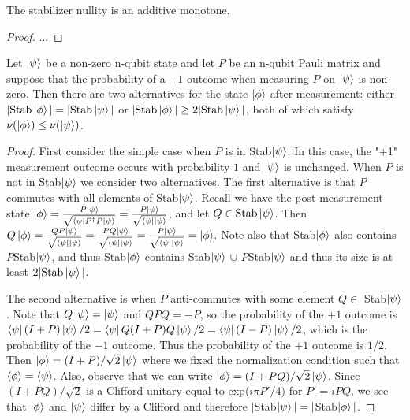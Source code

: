 \documentclass[12pt]{dalthesis}
\begin{document}
\begin{proposition}
The stabilizer nullity is an additive monotone.
\end{proposition}
\begin{proof}
...
\end{proof}

\begin{proposition}
Let $\ket{\psi}$ be a non-zero n-qubit state and let $P$ be an n-qubit Pauli matrix and suppose that the probability of a $+1$ outcome when measuring $P$ on $\ket{\psi}$ is non-zero. Then there are two alternatives for the state $\ket{\phi}$ after measurement: either $|\text{Stab}\ket{\phi}| = |\text{Stab}\ket{\psi}|$ or $|\text{Stab}\ket{\phi}| \geq 2|\text{Stab}\ket{\psi}|$, both of which satisfy $\nu(\ket{\phi}) \leq \nu(\ket{\psi})$.
\end{proposition}

\begin{proof}
First consider the simple case when $P$ is in Stab$\ket{\psi}$. In this case, the "+1" measurement outcome occurs with probability $1$ and $\ket{\psi}$ is unchanged. When $P$ is not in Stab$\ket{\psi}$ we consider two alternatives. The first alternative is that $P$ commutes with all elements of Stab$\ket{\psi}$. Recall we have the post-measurement state $\ket{\phi} = \frac{P\ket{\psi}}{\sqrt{\bra{\psi}P^{\dag}P\ket{\psi}}} = \frac{P\ket{\psi}}{\sqrt{\bra{\psi}\ket{\psi}}}$, and let $Q \in \text{Stab}\ket{\psi}$. Then $Q\ket{\phi} = \frac{QP\ket{\psi}}{\sqrt{\bra{\psi}\ket{\psi}}} = \frac{PQ\ket{\psi}}{\sqrt{\bra{\psi}\ket{\psi}}} = \frac{P\ket{\psi}}{\sqrt{\bra{\psi}\ket{\psi}}} = \ket{\phi}$. Note also that Stab$\ket{\phi}$ also contains $P$Stab$\ket{\psi}$, and thus Stab$\ket{\phi}$ contains Stab$\ket{\psi}$ $\cup$ $P$Stab$\ket{\psi}$ and thus its size is at least $2| \text{Stab}\ket{\psi}|$.

The second alternative is when $P$ anti-commutes with some element $Q \in$ Stab$\ket{\psi}$. Note that $Q\ket{\psi} = \ket{\psi}$ and $QPQ = -P$, so the probability of the $+1$ outcome is $\bra{\psi}(I+P)\ket{\psi}/2 = \bra{\psi}Q(I+P)Q\ket{\psi}/2 = \bra{\psi}(I-P)\ket{\psi}/2$, which is the probability of the $-1$ outcome. Thus the probability of the $+1$ outcome is $1/2$. Then $\ket{\phi} = (I+P)/\sqrt{2}\ket{\psi}$ where we fixed the normalization condition such that $\braket{\phi} = \braket{\psi}$. Also, observe that we can write $\ket{\phi} = (I+PQ)/\sqrt{2}\ket{\psi}$. Since $(I+PQ)/\sqrt{2}$ is a Clifford unitary equal to exp($i\pi P'/4)$ for $P' = iPQ$, we see that $\ket{\phi}$ and $\ket{\psi}$ differ by a Clifford and therefore $|$Stab$\ket{\psi}| = |$Stab$\ket{\phi}|$.
\end{proof}
\end{document}
